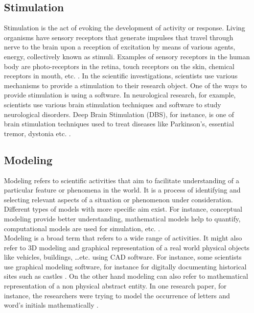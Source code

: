 \subsection{Stimulation}
\label{sec:purpose:Types:Stimulation}

Stimulation is the act of evoking the development of activity or response. Living organisms have sensory receptors that generate impulses that travel through nerve to the brain upon a reception of excitation by means of various agents, energy, collectively known as stimuli. Examples of sensory receptors in the human body are photo-receptors in the retina, touch receptors on the skin, chemical receptors in mouth, etc. \citep{enwiki:976395276}. 
In the scientific investigations, scientists use various mechanisms to provide a stimulation to their research object. One of the ways to provide stimulation is using a software. In neurological research, for example, scientists use various brain stimulation techniques and software to study neurological disorders.  Deep Brain Stimulation (DBS), for instance, is one of brain stimulation techniques used to treat diseases like Parkinson’s, essential tremor, dystonia etc. \citep{schermer2011ethical}.




\subsection{Modeling}
\label{sec:purpose:Types:Modelling}

Modeling refers to scientific activities that aim to facilitate understanding of a particular feature or phenomena in the world. It is a process of identifying and selecting relevant aspects of a situation or phenomenon under consideration. Different types of models with more specific aim exist.  For instance, conceptual modeling provide better understanding, mathematical models help to quantify, computational models are used for simulation, etc. \citep{enwiki:1051627717}.\\

Modeling is a broad term that refers to a wide range of activities. It might also refer to 3D modeling and graphical representation of a real world physical objects like vehicles, buildings, …etc.  using \ac{CAD} software. For instance, some scientists use graphical modeling software, for instance for digitally documenting historical sites such as castles \citep{el2007detailed}. On the other hand modeling can also refer to mathematical representation of a non physical abstract entity. In one research paper, for instance, the researchers were trying to model the occurrence of letters and word’s initials mathematically \citep{pande2010mathematical}. \\


